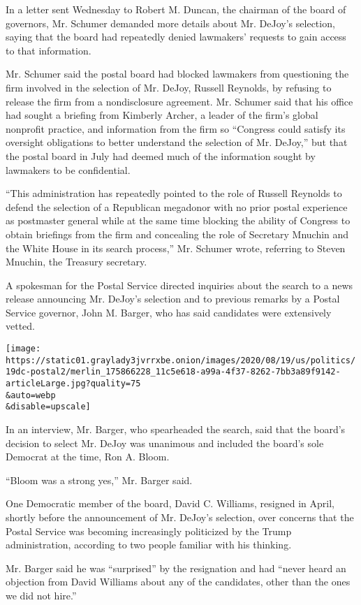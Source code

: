 In a letter sent Wednesday to Robert M. Duncan, the chairman of the
board of governors, Mr. Schumer demanded more details about Mr. DeJoy's
selection, saying that the board had repeatedly denied lawmakers'
requests to gain access to that information.

Mr. Schumer said the postal board had blocked lawmakers from questioning
the firm involved in the selection of Mr. DeJoy, Russell Reynolds, by
refusing to release the firm from a nondisclosure agreement. Mr. Schumer
said that his office had sought a briefing from Kimberly Archer, a
leader of the firm's global nonprofit practice, and information from the
firm so ``Congress could satisfy its oversight obligations to better
understand the selection of Mr. DeJoy,'' but that the postal board in
July had deemed much of the information sought by lawmakers to be
confidential.

``This administration has repeatedly pointed to the role of Russell
Reynolds to defend the selection of a Republican megadonor with no prior
postal experience as postmaster general while at the same time blocking
the ability of Congress to obtain briefings from the firm and concealing
the role of Secretary Mnuchin and the White House in its search
process,'' Mr. Schumer wrote, referring to Steven Mnuchin, the Treasury
secretary.

A spokesman for the Postal Service directed inquiries about the search
to a news release announcing Mr. DeJoy's selection and to previous
remarks by a Postal Service governor, John M. Barger, who has said
candidates were extensively vetted.

\texttt{[image: https://static01.graylady3jvrrxbe.onion/images/2020/08/19/us/politics/19dc-postal2/merlin\_175866228\_11c5e618-a99a-4f37-8262-7bb3a89f9142-articleLarge.jpg?quality=75\\\&auto=webp\\\&disable=upscale]}

In an interview, Mr. Barger, who spearheaded the search, said that the
board's decision to select Mr. DeJoy was unanimous and included the
board's sole Democrat at the time, Ron A. Bloom.

``Bloom was a strong yes,'' Mr. Barger said.

One Democratic member of the board, David C. Williams, resigned in
April, shortly before the announcement of Mr. DeJoy's selection, over
concerns that the Postal Service was becoming increasingly politicized
by the Trump administration, according to two people familiar with his
thinking.

Mr. Barger said he was ``surprised'' by the resignation and had ``never
heard an objection from David Williams about any of the candidates,
other than the ones we did not hire.''

